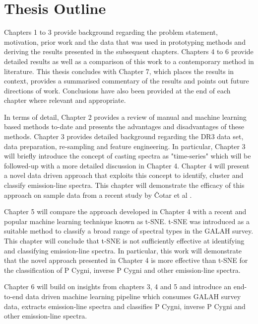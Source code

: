 \section{Thesis Outline}

Chapters 1 to 3 provide background regarding the problem statement, motivation, prior work and the data that was used in prototyping methods and deriving the results presented in the subsequent chapters. Chapters 4 to 6 provide detailed results as well as a comparison of this work to a contemporary method in literature. This thesis concludes with Chapter 7, which places the results in context, provides a summarised commentary of the results and points out future directions of work. Conclusions have also been provided at the end of each chapter where relevant and appropriate. 

In terms of detail, Chapter 2 provides a review of manual and machine learning based methods to-date and presents the advantages and disadvantages of these methods. Chapter 3 provides detailed background regarding the DR3 data set, data preparation, re-sampling and feature engineering. In particular, Chapter 3 will briefly introduce the concept of casting spectra as "time-series" which will be followed-up with a more detailed discussion in Chapter 4. Chapter 4 will present a novel data driven approach that exploits this concept to identify, cluster and classify emission-line spectra. This chapter will demonstrate the efficacy of this approach on sample data from a recent study by Čotar et al \cite{vcotar2021galah}. 

Chapter 5 will compare the approach developed in Chapter 4 with a recent and popular machine learning technique known as t-SNE. t-SNE was introduced as a suitable method to classify a broad range of spectral types in the GALAH survey. This chapter will conclude that t-SNE is not sufficiently effective at identifying and classifying emission-line spectra. In particular, this work will demonstrate that the novel approach presented in Chapter 4 is more effective than t-SNE for the classification of P Cygni, inverse P Cygni and other emission-line spectra.

Chapter 6 will build on insights from chapters 3, 4 and 5 and introduce an end-to-end data driven machine learning pipeline which consumes GALAH survey data, extracts emission-line spectra and classifies P Cygni, inverse P Cygni and other emission-line spectra. 


